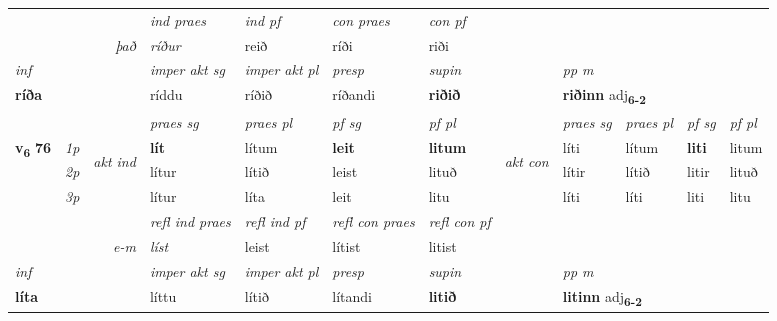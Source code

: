 \begin{longtable}[l]{X>{\footnotesize\itshape}llXXXXlXXXX}
   && &  \textit{ind praes} & \textit{ind pf} & \textit{con praes} & \textit{con pf} \\*
\multicolumn{3}{r}{\textit{það}} & ríður & reið & ríði & riði \\*

\cmidrule{4-7}
   {\textit{inf}} & &  & \textit{imper akt sg} & \textit{imper akt pl}   & \textit{presp} & \textit{supin}  && \textit{pp m} \\*
  {\textbf{ríða}} & && ríddu  & ríðið   & ríðandi &  \textbf{riðið}  && \multicolumn{2}{l}{\textbf{riðinn} adj\textbf{\textsubscript{6-2}}} \\*

\midrule

 & &   & \textit{praes sg}  & \textit{praes pl}    & \textit{ pf sg} & \textit{pf pl} & & \textit{praes sg}  & \textit{praes pl}    & \textit{pf sg} & \textit{pf pl }  \\ \cmidrule{4-7} \cmidrule{9-12}
 \multirow{2}{*}{{{\textbf{v{\textsubscript{6}}} \Large{\textbf{76}}}}}  & 1p & \multirow{3}{*}{\begin{turn}{90}\textit{akt ind}\end{turn}} & \textbf{lít} & lítum & \textbf{leit} & \textbf{litum} & \multirow{3}{*}{\begin{turn}{90}\textit{akt con}\end{turn}} &líti & lítum & \textbf{liti} & litum\\*
 & 2p &  &  lítur  & lítið & leist & lituð & & lítir & lítið & litir & lituð \\*
 & 3p &  & lítur & líta & leit & litu & & líti & líti& liti & litu \\*
\cmidrule{4-7} \cmidrule{9-12}

 & && \textit{refl ind praes} & \textit{refl ind pf} & \textit{refl con praes} & \textit{refl con pf} \\*
\multicolumn{3}{r}{\textit{e-m}}& líst & leist & lítist & litist \\*

\cmidrule{4-7}
   {\textit{inf}} & &  & \textit{imper akt sg} & \textit{imper akt pl}   & \textit{presp} & \textit{supin}  && \textit{pp m} \\*
  {\textbf{líta}} & && líttu  & lítið   & lítandi &  \textbf{litið}  && \multicolumn{2}{l}{\textbf{litinn} adj\textbf{\textsubscript{6-2}}} \\*

\midrule


\end{longtable}
